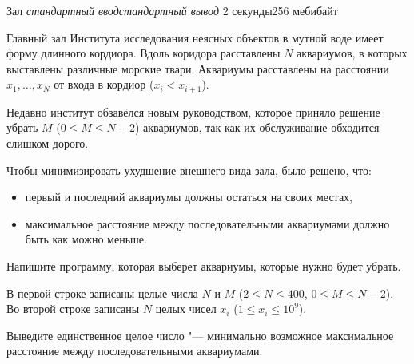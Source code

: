 %
%
\begin{problem}{Зал}
{\textsl{стандартный ввод}}{\textsl{стандартный вывод}}
{2 секунды}{256 мебибайт}{}

Главный зал Института исследования неясных объектов в мутной воде имеет
форму длинного кордиора. Вдоль коридора расставлены $N$ аквариумов,
в которых выставлены различные морские твари. Аквариумы расставлены
на расстоянии $x_1, \ldots, x_N$ от входа в кордиор ($x_i < x_{i + 1}$).

Недавно институт обзавёлся новым руководством, которое приняло решение
убрать $M$ ($0 \le M \le N - 2$) аквариумов, так как их обслуживание
обходится слишком дорого.

Чтобы минимизировать ухудшение внешнего вида зала, было решено, что:
\begin{itemize}
  \item первый и последний аквариумы должны остаться на своих местах,
  \item максимальное расстояние между последовательными аквариумами
    должно быть как можно меньше.
\end{itemize}

Напишите программу, которая выберет аквариумы, которые нужно будет
убрать.

\InputFile

В первой строке записаны целые числа $N$ и $M$
($2 \le N \le 400$, $0 \le M \le N - 2$).
Во второй строке записаны $N$ целых чисел $x_i$ ($1 \le x_i \le 10^9$).

\OutputFile

Выведите единственное целое число "--- минимально возможное максимальное
расстояние между последовательными аквариумами.

\Example

\begin{example}
%
\end{example}

\end{problem}
